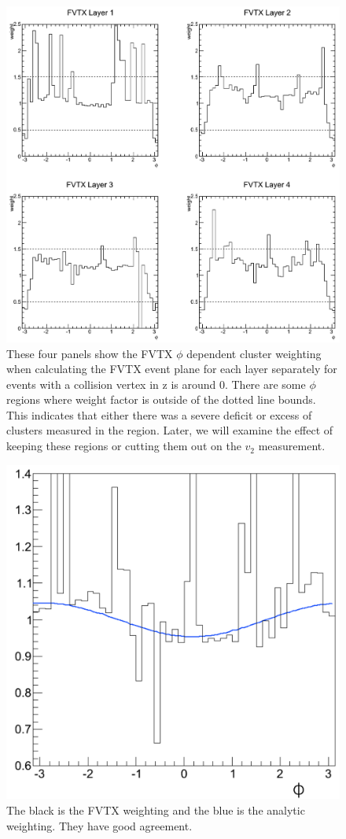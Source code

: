 \begin{figure}[h!]
\begin{center}
\includegraphics[width=0.75\linewidth]{figs/fvtx_weighting.png}
\caption{These four panels show the FVTX $\phi$ dependent cluster weighting when calculating the FVTX event plane for each layer separately for events with a collision vertex in z is around 0. There are some $\phi$ regions where weight factor is outside of the dotted line bounds. This indicates that either there was a severe deficit or excess of clusters measured in the region. Later, we will examine the effect of keeping these regions or cutting them out on the $v_2$ measurement.}
\label{fig:fvtx_weighting}
\end{center}
\end{figure}
\begin{figure}[!h]
\begin{center}
\includegraphics[width=0.5\linewidth]{figs/comparison_of_weights.png}
\caption{The black is the FVTX weighting and the blue is the analytic weighting. They have good agreement.}
\end{center}
\end{figure}

